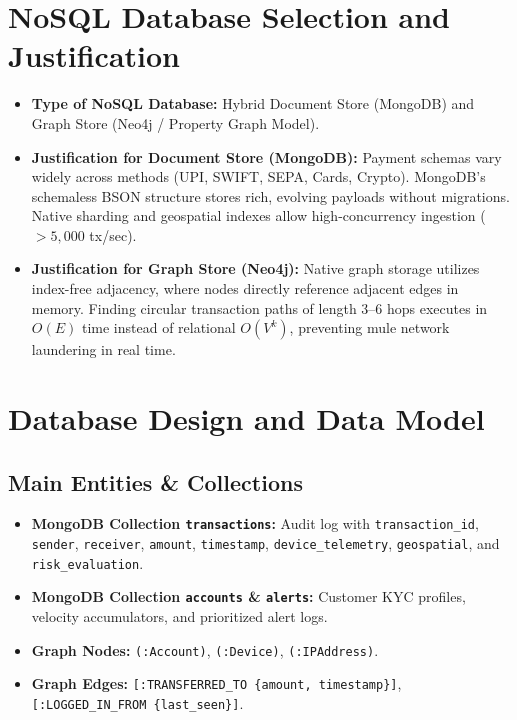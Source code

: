 \documentclass[11pt,a4paper]{article}
\begin{document}
\section{NoSQL Database Selection and Justification}
\begin{itemize}[leftmargin=1.5em]
    \item \textbf{Type of NoSQL Database:} Hybrid Document Store (MongoDB) and Graph Store (Neo4j / Property Graph Model).
    \item \textbf{Justification for Document Store (MongoDB):} Payment schemas vary widely across methods (UPI, SWIFT, SEPA, Cards, Crypto). MongoDB's schemaless BSON structure stores rich, evolving payloads without migrations. Native sharding and geospatial indexes allow high-concurrency ingestion ($>5,000$ tx/sec).
    \item \textbf{Justification for Graph Store (Neo4j):} Native graph storage utilizes index-free adjacency, where nodes directly reference adjacent edges in memory. Finding circular transaction paths of length 3--6 hops executes in $O(E)$ time instead of relational $O(V^k)$, preventing mule network laundering in real time.
\end{itemize}

\section{Database Design and Data Model}
\subsection*{Main Entities \& Collections}
\begin{itemize}[leftmargin=1.5em]
    \item \textbf{MongoDB Collection \texttt{transactions}:} Audit log with \texttt{transaction\_id}, \texttt{sender}, \texttt{receiver}, \texttt{amount}, \texttt{timestamp}, \texttt{device\_telemetry}, \texttt{geospatial}, and \texttt{risk\_evaluation}.
    \item \textbf{MongoDB Collection \texttt{accounts} \& \texttt{alerts}:} Customer KYC profiles, velocity accumulators, and prioritized alert logs.
    \item \textbf{Graph Nodes:} \texttt{(:Account)}, \texttt{(:Device)}, \texttt{(:IPAddress)}.
    \item \textbf{Graph Edges:} \texttt{[:TRANSFERRED\_TO \{amount, timestamp\}]}, \texttt{[:LOGGED\_IN\_FROM \{last\_seen\}]}.
\end{itemize}
\end{document}
